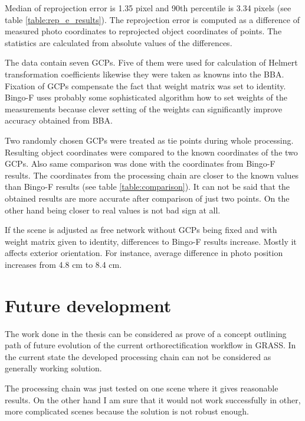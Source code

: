 \documentclass[a4paper,12pt]{article}
\begin{document}
Median of reprojection error is 1.35 pixel and 90th percentile is 3.34 pixels (see table \ref{table:rep_e_results}).
The reprojection error is computed as a difference of measured photo coordinates to 
reprojected object coordinates of points. The statistics are calculated from absolute values of the differences. 

The data contain seven GCPs. Five of them were used for calculation of  Helmert transformation coefficients
likewise they were taken as knowns into the BBA. 
Fixation of GCPs compensate the fact that weight matrix was set to identity. 
Bingo-F uses probably some sophisticated algorithm how to set weights of the measurements because 
clever setting of the weights can significantly improve accuracy obtained from BBA.

Two randomly chosen GCPs were treated as tie points during whole processing. 
Resulting object coordinates were compared to the known coordinates of the two GCPs.
Also same comparison was done with the coordinates from Bingo-F results. 
The coordinates from the processing chain are closer to the known values 
than Bingo-F results (see table \ref{table:comparison}). 
It can not be said that the obtained results 
are more accurate after comparison of just two points. On the other 
hand being closer to real values is  not bad sign at all.
 
If the scene is adjusted as free network without GCPs being fixed and with 
weight matrix given to identity, differences to Bingo-F results increase. 
Mostly it affects exterior orientation.
For instance, average difference in photo position increases from 4.8 cm to 8.4 cm.

\newpage
\section{Future development}

The work done in the thesis can be considered as prove of a concept
outlining path of future evolution of the current orthorectification workflow in GRASS. 
In the current state the developed 
processing chain can not be considered as generally working solution.

The processing chain was just tested 
 on one scene where it gives reasonable results. On the other hand 
I am sure that it would not work successfully in other, more complicated scenes because 
the solution is not robust enough.
\end{document}
